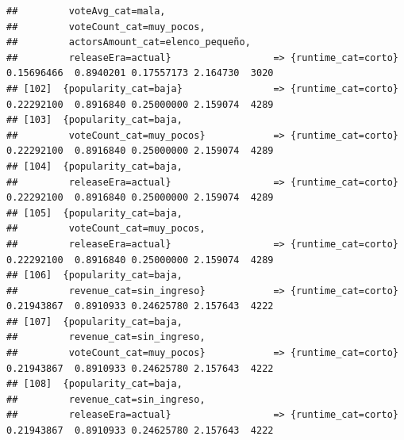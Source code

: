 \documentclass[
]{article}
\begin{document}
\begin{verbatim}
##         voteAvg_cat=mala,                                                                                                       
##         voteCount_cat=muy_pocos,                                                                                                
##         actorsAmount_cat=elenco_pequeño,                                                                                        
##         releaseEra=actual}                  => {runtime_cat=corto}               0.15696466  0.8940201 0.17557173 2.164730  3020
## [102]  {popularity_cat=baja}                => {runtime_cat=corto}               0.22292100  0.8916840 0.25000000 2.159074  4289
## [103]  {popularity_cat=baja,                                                                                                    
##         voteCount_cat=muy_pocos}            => {runtime_cat=corto}               0.22292100  0.8916840 0.25000000 2.159074  4289
## [104]  {popularity_cat=baja,                                                                                                    
##         releaseEra=actual}                  => {runtime_cat=corto}               0.22292100  0.8916840 0.25000000 2.159074  4289
## [105]  {popularity_cat=baja,                                                                                                    
##         voteCount_cat=muy_pocos,                                                                                                
##         releaseEra=actual}                  => {runtime_cat=corto}               0.22292100  0.8916840 0.25000000 2.159074  4289
## [106]  {popularity_cat=baja,                                                                                                    
##         revenue_cat=sin_ingreso}            => {runtime_cat=corto}               0.21943867  0.8910933 0.24625780 2.157643  4222
## [107]  {popularity_cat=baja,                                                                                                    
##         revenue_cat=sin_ingreso,                                                                                                
##         voteCount_cat=muy_pocos}            => {runtime_cat=corto}               0.21943867  0.8910933 0.24625780 2.157643  4222
## [108]  {popularity_cat=baja,                                                                                                    
##         revenue_cat=sin_ingreso,                                                                                                
##         releaseEra=actual}                  => {runtime_cat=corto}               0.21943867  0.8910933 0.24625780 2.157643  4222

\end{verbatim}
\end{document}
